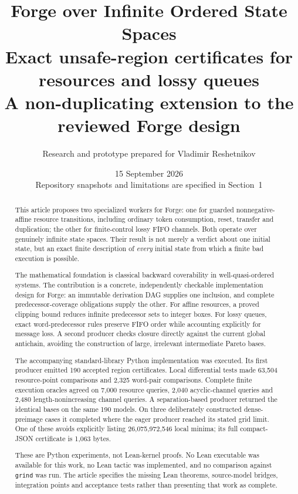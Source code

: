 \documentclass[11pt,a4paper]{article}
\title{\vspace{-1.5em}\textbf{Forge over Infinite Ordered State Spaces}\\[0.7em]
\large Exact unsafe-region certificates for resources and lossy queues\\[0.3em]
\normalsize A non-duplicating extension to the reviewed Forge design}
\author{Research and prototype prepared for Vladimir Reshetnikov}
\date{15 September 2026\\\small Repository snapshots and limitations are specified in Section~1}
\theoremstyle{definition}
\newcommand{\code}[1]{\texttt{#1}}
\begin{document}
\maketitle
\thispagestyle{empty}
\begin{abstract}
This article proposes two specialized workers for Forge: one for guarded
nonnegative-affine resource transitions, including ordinary token consumption,
reset, transfer and duplication; the other for finite-control lossy FIFO
channels. Both operate over genuinely infinite state spaces. Their result is
not merely a verdict about one initial state, but an exact finite description
of \emph{every} initial state from which a finite bad execution is possible.

The mathematical foundation is classical backward coverability in
well-quasi-ordered systems. The contribution is a concrete, independently
checkable implementation design for Forge: an immutable derivation DAG supplies
one inclusion, and complete predecessor-coverage obligations supply the other.
For affine resources, a proved clipping bound reduces infinite predecessor
sets to integer boxes. For lossy queues, exact word-predecessor rules preserve
FIFO order while accounting explicitly for message loss. A second producer
checks closure directly against the current global antichain, avoiding the
construction of large, irrelevant intermediate Pareto bases.

The accompanying standard-library Python implementation was executed. Its
first producer emitted 190 accepted region certificates. Local differential
tests made 63,504 resource-point comparisons and 2,325 word-pair comparisons.
Complete finite execution oracles agreed on 7,000 resource queries, 2,040
acyclic-channel queries and 2,480 length-nonincreasing channel queries. A
separation-based producer returned the identical bases on the same 190 models.
On three deliberately constructed dense-preimage cases it completed where the
eager producer reached its stated grid limit. One of these avoids explicitly
listing 26,075,972,546 local minima; its full compact-JSON certificate is 1,063
bytes.

These are Python experiments, not Lean-kernel proofs. No Lean executable was
available for this work, no Lean tactic was implemented, and no comparison
against \code{grind} was run. The article specifies the missing Lean theorems,
source-model bridges, integration points and acceptance tests rather than
presenting that work as complete.
\end{abstract}
\clearpage
\tableofcontents
\clearpage
\end{document}
